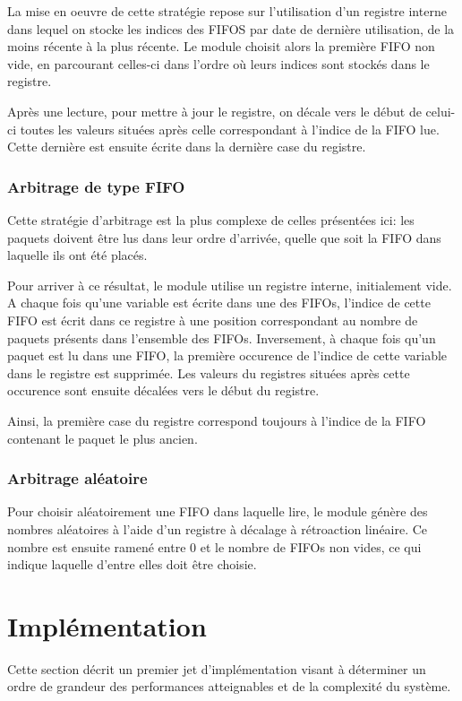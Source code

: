 \documentclass[11pt]{article}
\begin{document}
La mise en oeuvre de cette stratégie repose sur l'utilisation d'un registre interne
dans lequel on stocke les indices des FIFOS par date de dernière utilisation, de la moins récente à la plus récente.
Le module  choisit alors la première FIFO non vide, en parcourant celles-ci dans l'ordre où leurs indices sont stockés dans le registre.

Après une lecture, pour mettre à jour le registre, on décale vers le début de celui-ci toutes les valeurs situées après celle correspondant à l'indice de la FIFO lue.
Cette dernière est ensuite écrite dans la dernière case du registre.

\subsubsection{Arbitrage de type FIFO}
Cette stratégie d'arbitrage est la plus complexe de celles présentées ici:
les paquets doivent être lus dans leur ordre d'arrivée, quelle que soit
la FIFO dans laquelle ils ont été placés.

Pour arriver à ce résultat, le module utilise un registre interne, initialement vide.
A chaque fois qu'une variable est écrite dans une des FIFOs, l'indice de cette FIFO est écrit dans ce registre
à une position correspondant au nombre de paquets présents dans l'ensemble des FIFOs.
Inversement, à chaque fois qu'un paquet est lu dans une FIFO, la première occurence de l'indice de cette
variable dans le registre est supprimée. Les valeurs du registres situées après cette occurence sont ensuite décalées vers le début du registre.

Ainsi, la première case du registre correspond toujours à l'indice de la FIFO contenant le paquet le plus ancien.

\subsubsection{Arbitrage aléatoire}
Pour choisir aléatoirement une FIFO dans laquelle lire, le module génère des nombres aléatoires
à l'aide d'un registre à décalage à rétroaction linéaire.
Ce nombre est ensuite ramené entre 0 et le nombre de FIFOs non vides, ce qui indique laquelle d'entre elles doit être choisie.

\section{Implémentation}

Cette section décrit un premier jet d'implémentation visant à déterminer un ordre de grandeur des performances atteignables et de la complexité du système.
\end{document}

